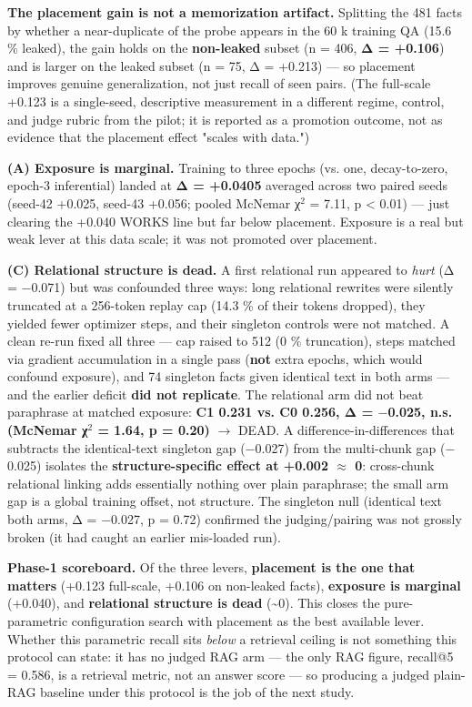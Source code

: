\documentclass[10pt,twocolumn]{article}
\begin{document}
\textbf{The placement gain is not a memorization artifact.} Splitting the 481 facts by whether a near-duplicate of the probe appears in the 60 k training QA (15.6 \% leaked), the gain holds on the \textbf{non-leaked} subset (n = 406, \textbf{Δ = +0.106}) and is larger on the leaked subset (n = 75, Δ = +0.213) --- so placement improves genuine generalization, not just recall of seen pairs. (The full-scale +0.123 is a single-seed, descriptive measurement in a different regime, control, and judge rubric from the pilot; it is reported as a promotion outcome, not as evidence that the placement effect "scales with data.")


\textbf{(A) Exposure is marginal.} Training to three epochs (vs. one, decay-to-zero, epoch-3 inferential) landed at \textbf{Δ = +0.0405} averaged across two paired seeds (seed-42 +0.025, seed-43 +0.056; pooled McNemar χ$^2$ = 7.11, p < 0.01) --- just clearing the +0.040 WORKS line but far below placement. Exposure is a real but weak lever at this data scale; it was not promoted over placement.


\textbf{(C) Relational structure is dead.} A first relational run appeared to \textit{hurt} (Δ = $-$0.071) but was confounded three ways: long relational rewrites were silently truncated at a 256-token replay cap (14.3 \% of their tokens dropped), they yielded fewer optimizer steps, and their singleton controls were not matched. A clean re-run fixed all three --- cap raised to 512 (0 \% truncation), steps matched via gradient accumulation in a single pass (\textbf{not} extra epochs, which would confound exposure), and 74 singleton facts given identical text in both arms --- and the earlier deficit \textbf{did not replicate}. The relational arm did not beat paraphrase at matched exposure: \textbf{C1 0.231 vs. C0 0.256, Δ = $-$0.025, n.s. (McNemar χ$^2$ = 1.64, p = 0.20)} $\to$ DEAD. A difference-in-differences that subtracts the identical-text singleton gap ($-$0.027) from the multi-chunk gap ($-$0.025) isolates the \textbf{structure-specific effect at +0.002 $\approx$ 0}: cross-chunk relational linking adds essentially nothing over plain paraphrase; the small arm gap is a global training offset, not structure. The singleton null (identical text both arms, Δ = $-$0.027, p = 0.72) confirmed the judging/pairing was not grossly broken (it had caught an earlier mis-loaded run).


\textbf{Phase-1 scoreboard.} Of the three levers, \textbf{placement is the one that matters} (+0.123 full-scale, +0.106 on non-leaked facts), \textbf{exposure is marginal} (+0.040), and \textbf{relational structure is dead} (\textasciitilde{}0). This closes the pure-parametric configuration search with placement as the best available lever. Whether this parametric recall sits \textit{below} a retrieval ceiling is not something this protocol can state: it has no judged RAG arm --- the only RAG figure, recall@5 = 0.586, is a retrieval metric, not an answer score --- so producing a judged plain-RAG baseline under this protocol is the job of the next study.
\end{document}
